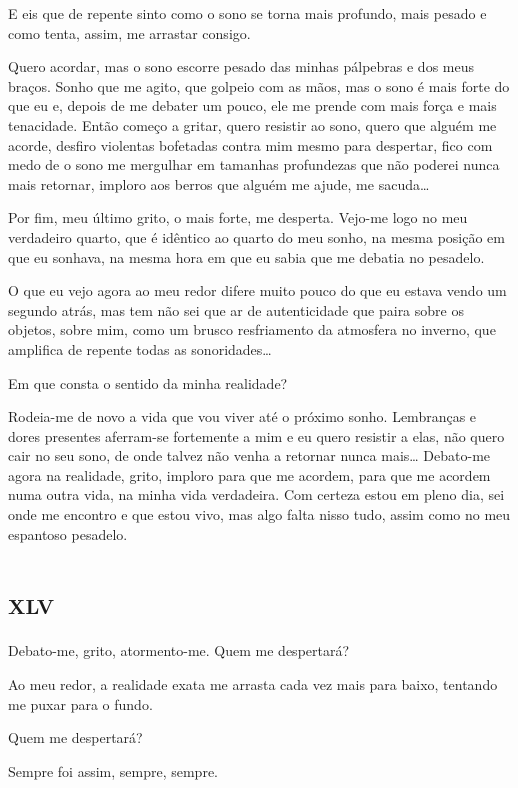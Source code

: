 E eis que de repente sinto como o sono se torna mais profundo, mais pesado e como tenta, assim, me arrastar consigo.

Quero acordar, mas o sono escorre pesado das minhas pálpebras e dos meus braços. Sonho que me agito, que golpeio com as mãos, mas o sono é mais forte do que eu e, depois de me debater um pouco, ele me prende com mais força e mais tenacidade. Então começo a gritar, quero resistir ao sono, quero que alguém me acorde, desfiro violentas bofetadas contra mim mesmo para despertar, fico com medo de o sono me mergulhar em tamanhas profundezas que não poderei nunca mais retornar, imploro aos berros que alguém me ajude, me sacuda\ldots{}

Por fim, meu último grito, o mais forte, me desperta. Vejo-me logo no meu verdadeiro quarto, que é idêntico ao quarto do meu sonho, na mesma posição em que eu sonhava, na mesma hora em que eu sabia que me debatia no pesadelo.

O que eu vejo agora ao meu redor difere muito pouco do que eu estava vendo um segundo atrás, mas tem não sei que ar de autenticidade que paira sobre os objetos, sobre mim, como um brusco resfriamento da atmosfera no inverno, que amplifica de repente todas as sonoridades\ldots{}

Em que consta o sentido da minha realidade?

Rodeia-me de novo a vida que vou viver até o próximo sonho. Lembranças e dores presentes aferram-se fortemente a mim e eu quero resistir a elas, não quero cair no seu sono, de onde talvez não venha a retornar nunca mais\ldots{}
Debato-me agora na realidade, grito, imploro para que me acordem, para que me acordem numa outra vida, na minha vida verdadeira. Com certeza estou em pleno dia, sei onde me encontro e que estou vivo, mas algo falta nisso tudo, assim como no meu espantoso pesadelo.


\chapter*{\huge\centering\textsc{xlv}}

Debato-me, grito, atormento-me. Quem me despertará?

Ao meu redor, a realidade exata me arrasta cada vez mais para baixo, tentando me puxar para o fundo.

Quem me despertará?

Sempre foi assim, sempre, sempre.
